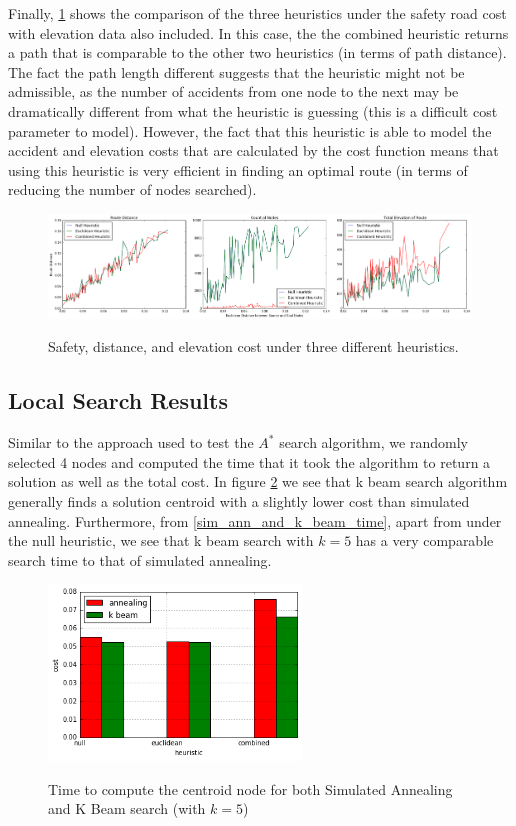 \documentclass[11pt]{article}
\begin{document}
Finally, \ref{simple_distance_elevation_and_safety} shows the comparison of the three heuristics under the safety road cost with elevation data also included. In this case, the the combined heuristic returns a path that is comparable to the other two heuristics (in terms of path distance). The fact the path length different suggests that the heuristic might not be admissible, as the number of accidents from one node to the next may be dramatically different from what the heuristic is guessing (this is a difficult cost parameter to model). However, the fact that this heuristic is able to model the accident and elevation costs that are calculated by the cost function means that using this heuristic is very efficient in finding an optimal route (in terms of reducing the number of nodes searched).

\begin{figure}[H]
\caption{Safety, distance, and elevation cost under three different heuristics.}
\includegraphics[width=1\textwidth]{../images/simple_distance_elevation_and_safety.png}
\label{simple_distance_elevation_and_safety}
\end{figure}

\subsection{Local Search Results}
Similar to the approach used to test the $A^{*}$ search algorithm, we randomly selected 4 nodes and computed the time that it took the algorithm to return a solution as well as the total cost. In figure \ref{sim_ann_and_k_beam_cost} we see that k beam search algorithm generally finds a solution centroid with a slightly lower cost than simulated annealing. Furthermore, from \ref{sim_ann_and_k_beam_time}, apart from under the null heuristic, we see that k beam search with $k=5$ has a very comparable search time to that of simulated annealing.

\begin{figure}[H]
\center
\caption{Time to compute the centroid node for both Simulated Annealing and K Beam search (with $k = 5$)}
\includegraphics[width=0.6\textwidth]{../images/sim_ann_and_k_beam.png}
\label{sim_ann_and_k_beam_cost}
\end{figure}
\end{document}
